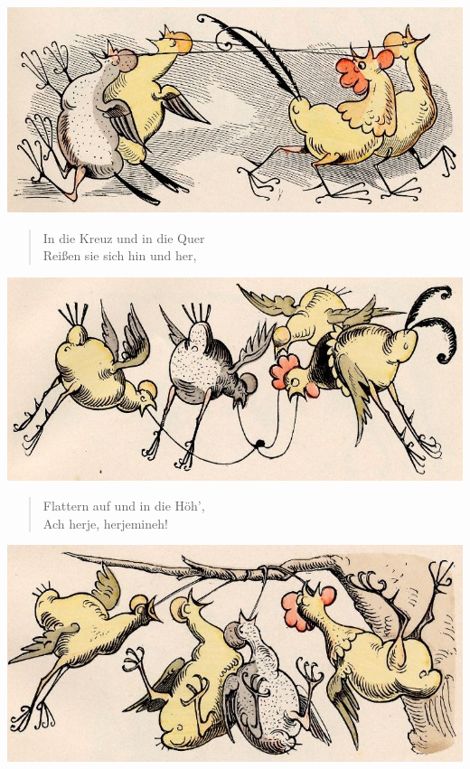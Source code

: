 \documentclass[a4paper,12pt]{article}
\begin{document}
\begin{center}\includegraphics[scale=.7, alt={Kreuz und Quer}]{images/1-07.jpg}\end{center}



\begin{verse}
In die Kreuz und in die Quer\\{}
Reißen sie sich hin und her,
\end{verse}



\begin{center}\includegraphics[scale=.7, alt={... und in die Höh}]{images/1-08.jpg}\end{center}



\begin{verse}
Flattern auf und in die Höh',\\{}
Ach herje, herjemineh!
\end{verse}



\begin{center}\includegraphics[scale=.7, alt={... auf den Ast}]{images/1-09.jpg}\end{center}
\end{document}
